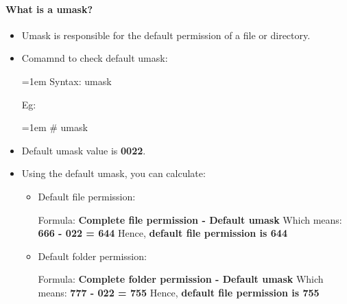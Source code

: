 \setlength{\columnsep}{3pt}
\begin{flushleft}
	\bigskip
	
	\paragraph{What is a umask?}
	\begin{itemize}
		\item Umask is responsible for the default permission of a file or directory.
		\item Comamnd to check default umask:
		\bigskip
		\begin{tcolorbox}[breakable,notitle,boxrule=1pt,colback=pink,colframe=pink]
			\color{black}
			\font=1em
			Syntax:  umask
			\font=4pt
		\end{tcolorbox}
		Eg:
		\bigskip
		\begin{tcolorbox}[breakable,notitle,boxrule=1pt,colback=black,colframe=black]
			\color{green}
			\font=1em
			\# umask
			\color{white}
			\font=4pt
		\end{tcolorbox}
		\item Default umask value is \textbf{0022}.
		\item Using the default umask, you can calculate:
		\begin{itemize}
			\item Default file permission:
			\bigskip
				\begin{tcolorbox}[breakable,notitle,boxrule=1pt,colback=pink,colframe=pink]
					\color{black}
					Formula:  \textbf{Complete file permission - Default umask}
					\newline
					Which means: \textbf{666 - 022 = 644}
					\newline
					Hence, \textbf{default file permission is 644}
				\end{tcolorbox}
			\bigskip
			\bigskip
			\item Default folder permission:
			\bigskip
					\begin{tcolorbox}[breakable,notitle,boxrule=1pt,colback=pink,colframe=pink]
					\color{black}
					Formula:  \textbf{Complete folder permission - Default umask}
					\newline
					Which means: \textbf{777 - 022 = 755}
					\newline
					Hence, \textbf{default file permission is 755}
				\end{tcolorbox}
		\end{itemize}
	\end{itemize}


\end{flushleft}
